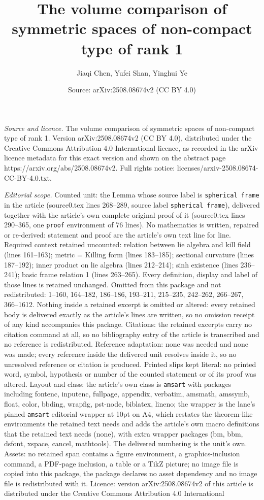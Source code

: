 \documentclass[10pt,a4paper]{amsart}
\title[The volume comparison of symmetric spaces of non-compact typ]{The volume comparison of symmetric spaces of non-compact type of rank 1}
\author{Jiaqi Chen, Yufei Shan, Yinghui Ye}
\date{Source: arXiv:2508.08674v2 (CC BY 4.0)}
\begin{document}
\maketitle

\noindent\emph{Source and licence.} The volume comparison of symmetric spaces of non-compact type of rank 1. Version arXiv:2508.08674v2 (CC BY 4.0), distributed under the Creative Commons Attribution 4.0 International licence, as recorded in the arXiv licence metadata for this exact version and shown on the abstract page https://arxiv.org/abs/2508.08674v2. Full rights notice: licenses/arxiv-2508.08674-CC-BY-4.0.txt.\par\smallskip

\noindent\textit{Editorial scope.} Counted unit: the Lemma whose source label is \texttt{spherical frame} in the article (source0.tex lines 268--289, source label \texttt{spherical frame}), delivered together with the article's own complete original proof of it (source0.tex lines 290--365, one \texttt{proof} environment of 76 lines). No mathematics is written, repaired or re-derived: statement and proof are the article's own text line for line. Required context retained uncounted: relation between lie algebra and kill field (lines 161--163); metric = Killing form (lines 183--185); sectional curvature (lines 187--192); inner product on lie algebra (lines 212--214); sinh existence (lines 236--241); basic frame relation 1 (lines 263--265). Every definition, display and label of those lines is retained unchanged. Omitted from this package and not redistributed: 1--160, 164--182, 186--186, 193--211, 215--235, 242--262, 266--267, 366--1612. Nothing inside a retained excerpt is omitted or altered: every retained body is delivered exactly as the article's lines are written, so no omission receipt of any kind accompanies this package. Citations: the retained excerpts carry no citation command at all, so no bibliography entry of the article is transcribed and no reference is redistributed. Reference adaptation: none was needed and none was made; every reference inside the delivered unit resolves inside it, so no unresolved reference or citation is produced. Printed slips kept literal: no printed word, symbol, hypothesis or number of the counted statement or of its proof was altered. Layout and class: the article's own class is \texttt{amsart} with packages including fontenc, inputenc, fullpage, appendix, verbatim, amsmath, amssymb, float, color, bbding, wrapfig, pst-node, biblatex, lineno; the wrapper is the lane's pinned \texttt{amsart} editorial wrapper at 10pt on A4, which restates the theorem-like environments the retained text needs and adds the article's own macro definitions that the retained text needs (none), with extra wrapper packages (bm, bbm, dsfont, xspace, cancel, mathtools). The delivered numbering is the unit's own. Assets: no retained span contains a figure environment, a graphics-inclusion command, a PDF-page inclusion, a table or a TikZ picture; no image file is copied into this package, the package declares no asset dependency and no image file is redistributed with it. Licence: version arXiv:2508.08674v2 of this article is distributed under the Creative Commons Attribution 4.0 International 
\end{document}
